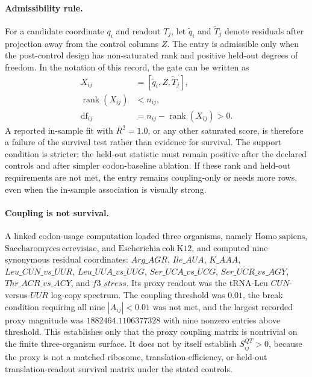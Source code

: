 \paragraph{Admissibility rule.}
For a candidate coordinate $q_i$ and readout $T_j$, let $\widetilde q_i$ and $\widetilde T_j$ denote residuals after projection away from the control columns $Z$. The entry is admissible only when the post-control design has non-saturated rank and positive held-out degrees of freedom. In the notation of this record, the gate can be written as
$$
\begin{aligned}
X_{ij} &= [\widetilde q_i, Z, \widetilde T_j],\\
\operatorname{rank}(X_{ij}) &< n_{ij},\\
\operatorname{df}_{ij} &= n_{ij}-\operatorname{rank}(X_{ij}) > 0.
\end{aligned}
$$
A reported in-sample fit with $R^2=1.0$, or any other saturated score, is therefore a failure of the survival test rather than evidence for survival. The support condition is stricter: the held-out statistic must remain positive after the declared controls and after simpler codon-baseline ablation. If these rank and held-out requirements are not met, the entry remains coupling-only or needs more rows, even when the in-sample association is visually strong.

\paragraph{Coupling is not survival.}
A linked codon-usage computation loaded three organisms, namely $\mathrm{Homo\ sapiens}$, $\mathrm{Saccharomyces\ cerevisiae}$, and $\mathrm{Escherichia\ coli\ K12}$, and computed nine synonymous residual coordinates: $Arg\_AGR$, $Ile\_AUA$, $K\_AAA$, $Leu\_CUN\_vs\_UUR$, $Leu\_UUA\_vs\_UUG$, $Ser\_UCA\_vs\_UCG$, $Ser\_UCR\_vs\_AGY$, $Thr\_ACR\_vs\_ACY$, and $f3\_stress$. Its proxy readout was the tRNA-Leu $CUN$-versus-$UUR$ log-copy spectrum. The coupling threshold was $0.01$, the break condition requiring all nine $|A_{ij}|<0.01$ was not met, and the largest recorded proxy magnitude was $1882464.1106377328$ with nine nonzero entries above threshold. This establishes only that the proxy coupling matrix is nontrivial on the finite three-organism surface. It does not by itself establish $S^{QT}_{ij}>0$, because the proxy is not a matched ribosome, translation-efficiency, or held-out translation-readout survival matrix under the stated controls.

